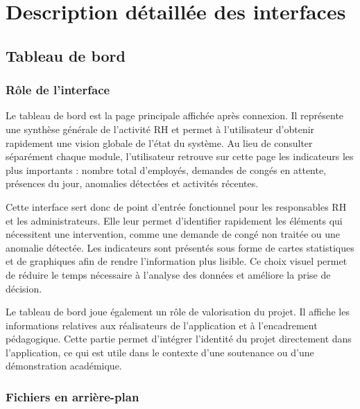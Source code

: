 \documentclass[12pt,a4paper]{report}
\begin{document}
\chapter{Description détaillée des interfaces}

\section{Tableau de bord}

\subsection{Rôle de l'interface}

Le tableau de bord est la page principale affichée après connexion. Il représente une synthèse générale de l'activité RH et permet à l'utilisateur d'obtenir rapidement une vision globale de l'état du système. Au lieu de consulter séparément chaque module, l'utilisateur retrouve sur cette page les indicateurs les plus importants : nombre total d'employés, demandes de congés en attente, présences du jour, anomalies détectées et activités récentes.

Cette interface sert donc de point d'entrée fonctionnel pour les responsables RH et les administrateurs. Elle leur permet d'identifier rapidement les éléments qui nécessitent une intervention, comme une demande de congé non traitée ou une anomalie détectée. Les indicateurs sont présentés sous forme de cartes statistiques et de graphiques afin de rendre l'information plus lisible. Ce choix visuel permet de réduire le temps nécessaire à l'analyse des données et améliore la prise de décision.

Le tableau de bord joue également un rôle de valorisation du projet. Il affiche les informations relatives aux réalisateurs de l'application et à l'encadrement pédagogique. Cette partie permet d'intégrer l'identité du projet directement dans l'application, ce qui est utile dans le contexte d'une soutenance ou d'une démonstration académique.

\subsection{Fichiers en arrière-plan}
\end{document}
